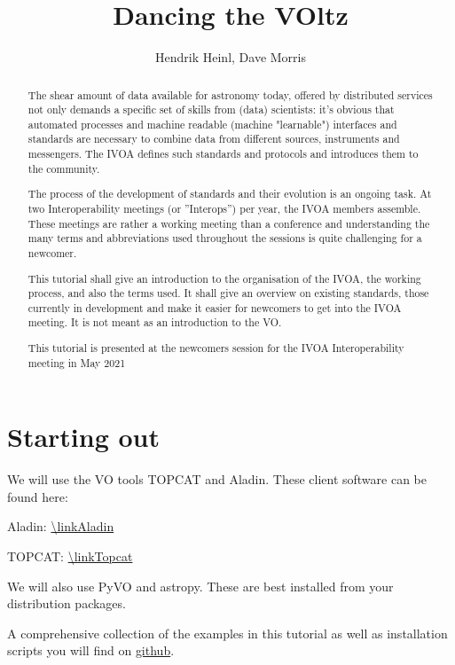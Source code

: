 \documentclass[twoside]{article}[12pt]
\title {Dancing the VOltz}
\author {Hendrik Heinl, Dave Morris}
\begin{document}


\maketitle

\pagebreak
\begin {abstract}
The shear amount of data available for astronomy today, offered by
distributed services not only demands a specific set of skills from
(data) scientists: it's obvious that automated processes and machine
readable (machine "learnable") interfaces and standards are necessary to
combine data from different sources, instruments and messengers. The
IVOA defines such standards and protocols and introduces them to the
community. 

The process of the development of standards and their evolution is an
ongoing task. At two Interoperability meetings (or ''Interops'') per
year, the IVOA members assemble. These meetings are rather a working
meeting than a conference and understanding the many terms and
abbreviations used throughout the sessions is quite challenging for a
newcomer.  

This tutorial shall give an introduction to the organisation of the
IVOA, the working process, and also the terms used. It shall give an
overview on existing standards, those currently in development and make
it easier for newcomers to get into the IVOA meeting. It is not meant as
an introduction to the VO. 

This tutorial is presented at the newcomers session for the IVOA
Interoperability meeting in May 2021\end{abstract}


\section{Starting out}
We will use the VO tools TOPCAT and Aladin. These client
software can be found here:

Aladin: \url{\linkAladin}

TOPCAT: \url{\linkTopcat}

We will also use PyVO and astropy. These are best installed from your
distribution packages. 

A comprehensive collection of the examples in this tutorial as well as
installation scripts you will find on
\href{https://github.com/hendhd/ivoa_newcomers/tree/main/2021_northern_spring}{github}. 
\end{document}
